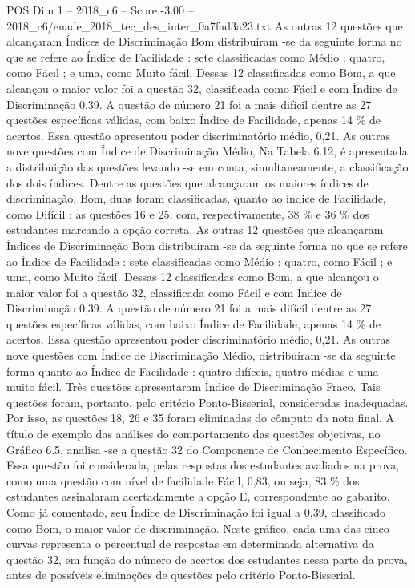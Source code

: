 \begin{textsample}{POS Dim 1 – 2018\_c6 – Score -3.00 – 2018\_c6/enade\_2018\_tec\_des\_inter\_0a7fad3a23.txt}
As outras 12 questões que alcançaram Índices de Discriminação Bom distribuíram -se da seguinte forma no que se refere ao Índice de Facilidade : sete classificadas como Médio ; quatro, como Fácil ; e uma, como Muito fácil.
Dessas 12 classificadas como Bom, a que alcançou o maior valor foi a questão 32, classificada como Fácil e com Índice de Discriminação 0,39.
A questão de número 21 foi a mais difícil dentre as 27 questões específicas válidas, com baixo Índice de Facilidade, apenas 14 \% de acertos.
Essa questão apresentou poder discriminatório médio, 0,21.
As outras nove questões com Índice de Discriminação Médio, Na Tabela 6.12, é apresentada a distribuição das questões levando -se em conta, simultaneamente, a classificação dos dois índices.
Dentre as questões que alcançaram os maiores índices de discriminação, Bom, duas foram classificadas, quanto ao índice de Facilidade, como Difícil : as questões 16 e 25, com, respectivamente, 38 \% e 36 \% dos estudantes marcando a opção correta.
As outras 12 questões que alcançaram Índices de Discriminação Bom distribuíram -se da seguinte forma no que se refere ao Índice de Facilidade : sete classificadas como Médio ; quatro, como Fácil ; e uma, como Muito fácil.
Dessas 12 classificadas como Bom, a que alcançou o maior valor foi a questão 32, classificada como Fácil e com Índice de Discriminação 0,39.
A questão de número 21 foi a mais difícil dentre as 27 questões específicas válidas, com baixo Índice de Facilidade, apenas 14 \% de acertos.
Essa questão apresentou poder discriminatório médio, 0,21.
As outras nove questões com Índice de Discriminação Médio, distribuíram -se da seguinte forma quanto ao Índice de Facilidade : quatro difíceis, quatro médias e uma muito fácil.
Três questões apresentaram Índice de Discriminação Fraco.
Tais questões foram, portanto, pelo critério Ponto-Bisserial, consideradas inadequadas.
Por isso, as questões 18, 26 e 35 foram eliminadas do cômputo da nota final.
A título de exemplo das análises do comportamento das questões objetivas, no Gráfico 6.5, analisa -se a questão 32 do Componente de Conhecimento Específico.
Essa questão foi considerada, pelas respostas dos estudantes avaliados na prova, como uma questão com nível de facilidade Fácil, 0,83, ou seja, 83 \% dos estudantes assinalaram acertadamente a opção E, correspondente ao gabarito.
Como já comentado, seu Índice de Discriminação foi igual a 0,39, classificado como Bom, o maior valor de discriminação.
Neste gráfico, cada uma das cinco curvas representa o percentual de respostas em determinada alternativa da questão 32, em função do número de acertos dos estudantes nessa parte da prova, antes de possíveis eliminações de questões pelo critério Ponto-Bisserial.

\end{textsample}
